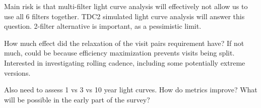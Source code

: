 
Main risk is that multi-filter light curve analysis will effectively
not allow us  to use all 6 filters together. TDC2 simulated light curve analysis will answer this
question.  2-filter alternative
is important, as a pessimistic limit.

How much effect did the relaxation of the visit pairs requirement
have? If not much, could be because efficiency maximization prevents
visits being split. Interested in investigating rolling cadence,
including  some potentially extreme versions.

Also need to assess 1 vs 3 vs 10 year light curves. How do metrics
improve? What will be possible in the early part of the survey?


\navigationbar

